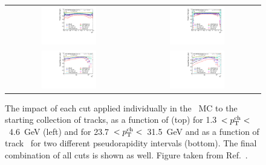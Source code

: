 \begin{figure}
\centering
\begin{tabular}{cc}
\includegraphics[width=0.45\textwidth]{figures/main/performance/cut_flow_RecoNorm_MC_pT_4_6_jet.pdf} &
\includegraphics[width=0.45\textwidth]{figures/main/performance/cut_flow_RecoNorm_MC_pT_23p7_31p5_jet.pdf} \\
\includegraphics[width=0.45\textwidth]{figures/main/performance/cut_flow_RecoNorm_MC_eta_0p05_jet.pdf} &
\includegraphics[width=0.45\textwidth]{figures/main/performance/cut_flow_RecoNorm_MC_eta_2p05_jet.pdf} \\
\end{tabular}
\caption{The impact of each cut applied individually in the \pp\ MC to the starting collection of tracks, as a function of
\etatrk (top) for 1.3~$< \mbox{$p_{\mathrm{T}}^{\mathrm{ch}}$}<$~4.6~GeV (left) and for 23.7~$<\mbox{$p_{\mathrm{T}}^{\mathrm{ch}}$}<$~31.5~GeV and as a function of track \pT\ for two different pseudorapidity intervals (bottom).
The final combination of all cuts is shown as well.
Figure taken from Ref.~\cite{Sickles:2235420}.}
\label{fig:ppcutflow_eta}
\end{figure}

